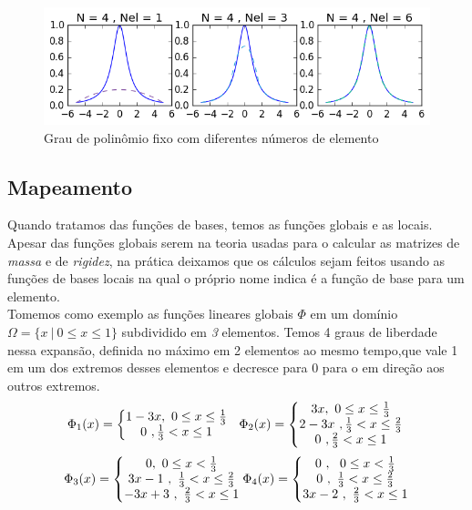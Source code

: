\begin{figure}[!b]
\includegraphics[width=0.6 \textwidth, center]{figuras/compara_metodo_n2.png}
\caption{Grau de polinômio fixo com diferentes números de elemento}
\end{figure}

\pagebreak

 
\subsection{Mapeamento}
 Quando tratamos das funções de bases, temos as funções globais e as locais. Apesar das funções globais serem na teoria usadas para o calcular as matrizes de \emph{massa} e de \emph{rigidez}, na prática deixamos que os cálculos sejam feitos usando as funções de bases locais na qual o próprio nome indica é a função de base para um elemento.\\
 Tomemos como exemplo as funções lineares globais $\Phi$ em um domínio $\Omega = \{x\ |\ 0\leq x \leq 1\}$ subdividido em \emph{3} elementos. Temos 4 graus de liberdade nessa expansão, definida no máximo em 2 elementos ao mesmo tempo,que vale 1 em um dos extremos desses elementos e decresce para 0 para o em direção aos outros extremos.
\begin{equation}
\Phi_1(x) = \left\{\begin{matrix}
1 - 3x,\ 0 \leq x \leq \frac{1}{3}\\
0\ , \frac{1}{3} < x \leq 1
\end{matrix}\right.\ \ 
\Phi_2(x) = \left\{\begin{matrix}
3x,\ 0 \leq x \leq \frac{1}{3}\\
2 - 3x\ , \frac{1}{3} < x \leq \frac{2}{3}\\
0\ , \frac{2}{3} < x \leq 1
\end{matrix}\right.\\
\end{equation} 
\begin{equation}
\Phi_3(x) = \left\{\begin{matrix}
0 ,\ 0 \leq x < \frac{1}{3}\\
3x - 1\ ,\ \frac{1}{3} < x \leq \frac{2}{3}\\
-3x + 3 \ ,\ \frac{2}{3} < x \leq 1
\end{matrix}\right.\\
\Phi_4(x) = \left\{\begin{matrix}
0\ ,\ \ 0 \leq x < \frac{1}{3}\\
0\ ,\ \frac{1}{3} < x \leq \frac{2}{3}\\
3x -2 \ ,\ \frac{2}{3} < x \leq 1
\end{matrix}\right.
\end{equation}

